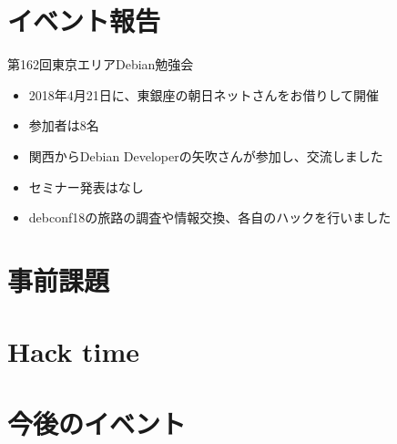 \section{イベント報告}

\begin{frame}{第162回東京エリアDebian勉強会}
\begin{itemize}
\item 2018年4月21日に、東銀座の朝日ネットさんをお借りして開催
\item 参加者は8名
\item 関西からDebian Developerの矢吹さんが参加し、交流しました
\item セミナー発表はなし
\item debconf18の旅路の調査や情報交換、各自のハックを行いました
\end{itemize} 
\end{frame}


\section{事前課題}
{\footnotesize
 
}

%


\section{Hack time}

  
\section{今後のイベント}

